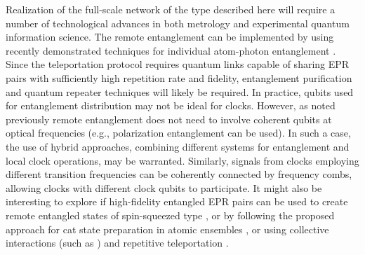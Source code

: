 Realization of the full-scale network of the type described here will require a
number of technological advances in both metrology and experimental quantum
information science. 
The remote entanglement can be implemented by using recently demonstrated
techniques for individual atom-photon entanglement \cite{Olmschenk2009,
Chou2007, Togan2010, Bernien2013, Riste2013}. Since the teleportation protocol
requires quantum links capable of sharing EPR pairs with sufficiently high
repetition rate and fidelity, entanglement purification \cite{Dur1999} and
quantum repeater techniques \cite{Duan2001} will likely be required. In
practice, qubits used for entanglement distribution may not be ideal for clocks.
 However, as noted previously  remote entanglement does not need to involve
coherent qubits at optical frequencies (e.g., polarization entanglement can be
used). In such a case,   the use of hybrid approaches, combining  different
systems for entanglement and local clock operations, may be warranted.
Similarly, signals from clocks employing different transition frequencies
can be coherently connected by frequency combs, allowing clocks with different
clock qubits to participate.
It might also be interesting to explore if high-fidelity entangled EPR pairs can
be used to create remote entangled states of spin-squeezed type \cite{Leroux2010,
Sherson2006, Ma2012}, or by following the proposed approach for cat state
preparation in atomic ensembles \cite{McConnell2013}, 
or using collective interactions (such as \cite{MSgate}) and repetitive teleportation 
\cite{Andersen2013}.
